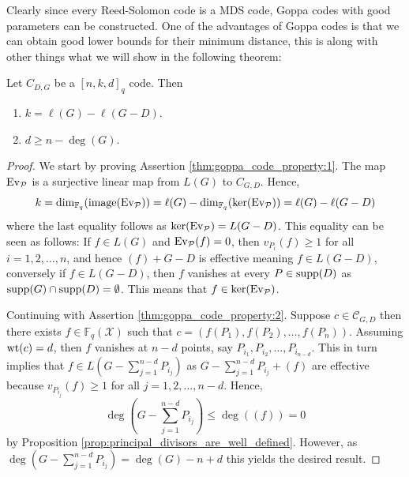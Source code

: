 Clearly since every Reed-Solomon code is a MDS code, Goppa codes with good parameters can be constructed. One of the advantages of Goppa codes is that we can obtain good lower bounds for their minimum distance, this is along with other things what we will show in the following theorem:
\begin{theorem}\label{thm:goppa_code_properties}
  Let $C_{D, G}$ be a $[n, k, d]_{q}$ code. Then
  \begin{enumerate}
    \item $k = \ell(G) - \ell(G - D)$. \label{thm:goppa_code_property:1}
    \item $d \geq n - \deg(G)$. \label{thm:goppa_code_property:2}
  \end{enumerate}
\end{theorem}
\begin{proof}
  We start by proving Assertion \ref{thm:goppa_code_property:1}. The map $\textnormal{Ev}_\mathcal{P}$ is a surjective linear map from $L(G)$ to $C_{G, D}$. Hence,
  \begin{equation*}
    k = \dim_{\mathbb{F}_{q}}(\textnormal{image}(\textnormal{Ev}_\mathcal{P})) = \ell(G) - \dim_{\mathbb{F}_{q}}(\ker(\textnormal{Ev}_\mathcal{P})) = \ell(G) - \ell(G - D)
  \end{equation*}
  where the last equality follows as $\ker(\textnormal{Ev}_\mathcal{P}) = L(G - D)$. This equality can be seen as follows: If $f \in L(G)$ and $\textnormal{Ev}_\mathcal{P}(f) = 0$, then $v_{P_{i}}(f) \geq 1$ for all $i = 1, 2, \ldots, n$, and hence $(f) + G - D$ is effective meaning $f \in L(G - D)$, conversely if $f \in L(G - D)$, then $f$ vanishes at every $P \in \textnormal{supp}(D)$ as $\textnormal{supp}(G) \cap \textnormal{supp}(D) = \emptyset$. This means that $f \in \ker(\textnormal{Ev}_\mathcal{P})$.

  Continuing with Assertion \ref{thm:goppa_code_property:2}. Suppose $c \in \mathcal{C}_{G, D}$ then there exists $f \in \mathbb{F}_{q}(\mathcal{X})$ such that $c = (f(P_1), f(P_2), \ldots, f(P_{n}))$. Assuming $\mathrm{wt}(c) = d$, then $f$ vanishes at $n - d$ points, say $P_{i_{1}}, P_{i_{2}}, \ldots, P_{i_{n - d}}$. This in turn implies that $f \in L\left(G - \sum_{j = 1}^{n- d} P_{i_{j}}\right)$ as $G - \sum_{j = 1}^{n - d} P_{i_{j}} + (f)$ are effective because $v_{P_{i_{j}}}(f) \geq 1$ for all $j = 1, 2, \ldots, n - d$. Hence,
  \begin{equation*}
    \deg \left(G - \sum_{j = 1}^{n - d} P_{i_{j}}\right) \leq \deg((f)) = 0
  \end{equation*}
  by Proposition \ref{prop:principal_divisors_are_well_defined}. However, as $\deg \left(G - \sum_{j = 1}^{n - d} P_{i_{j}}\right) = \deg(G) - n + d$ this yields the desired result.
\end{proof}

